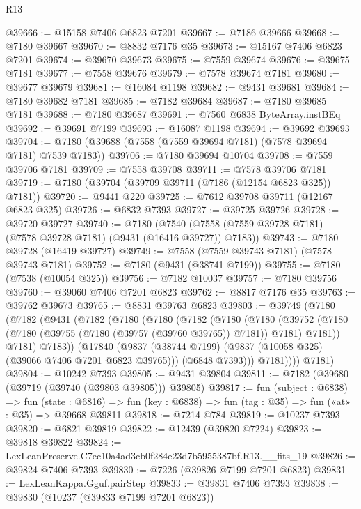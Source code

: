 \begin{lexlean}{R13}
\begin{coremodule}
@39666 := @15158 @7406 @6823 @7201
@39667 := @7186 @39666
@39668 := @7180 @39667
@39670 := @8832 @7176 @35
@39673 := @15167 @7406 @6823 @7201
@39674 := @39670 @39673
@39675 := @7559 @39674
@39676 := @39675 @7181
@39677 := @7558 @39676
@39679 := @7578 @39674 @7181
@39680 := @39677 @39679
@39681 := @16084 @1198
@39682 := @9431 @39681
@39684 := @7180 @39682 @7181
@39685 := @7182 @39684
@39687 := @7180 @39685 @7181
@39688 := @7180 @39687
@39691 := @7560 @6838 ByteArray.instBEq
@39692 := @39691 @7199
@39693 := @16087 @1198
@39694 := @39692 @39693
@39704 := @7180 (@39688 (@7558 (@7559 @39694 @7181) (@7578 @39694 @7181) @7539 @7183))
@39706 := @7180 @39694 @10704
@39708 := @7559 @39706 @7181
@39709 := @7558 @39708
@39711 := @7578 @39706 @7181
@39719 := @7180 (@39704 (@39709 @39711 (@7186 (@12154 @6823 @325)) @7181))
@39720 := @9441 @220
@39725 := @7612 @39708 @39711 (@12167 @6823 @325)
@39726 := @6832 @7393
@39727 := @39725 @39726
@39728 := @39720 @39727
@39740 := @7180
    (@7540 (@7558 (@7559 @39728 @7181) (@7578 @39728 @7181) (@9431 (@16416 @39727)) @7183))
@39743 := @7180 @39728 (@16419 @39727)
@39749 := @7558 (@7559 @39743 @7181) (@7578 @39743 @7181)
@39752 := @7180 (@9431 (@38741 @7199))
@39755 := @7180 (@7538 (@10054 @325))
@39756 := @7182 @10037
@39757 := @7180 @39756
@39760 := @39060 @7406 @7201 @6823
@39762 := @8817 @7176 @35
@39763 := @39762 @39673
@39765 := @8831 @39763 @6823
@39803 := @39749
    (@7180
      (@7182
        (@9431
          (@7182
            (@7180
              (@7180
                (@7182
                  (@7180
                    (@7180
                      (@39752
                        (@7180 (@7180 (@39755 (@7180 (@39757 (@39760 @39765)) @7181)) @7181) @7181))
                      @7181)
                    @7183))
                (@17840
                  (@9837 (@38744 @7199) (@9837 (@10058 @325) (@39066 @7406 @7201 @6823 @39765)))
                  (@6848 @7393)))
              @7181))))
      @7181)
@39804 := @10242 @7393
@39805 := @9431 @39804
@39811 := @7182 (@39680 (@39719 (@39740 (@39803 @39805))) @39805)
@39817 := fun (subject : @6838) =>
  fun (state : @6816) => fun (key : @6838) => fun (tag : @35) => fun («at» : @35) => @39668 @39811
@39818 := @7214 @784
@39819 := @10237 @7393
@39820 := @6821 @39819
@39822 := @12439 (@39820 @7224)
@39823 := @39818 @39822
@39824 := LexLeanPreserve.C7ec10a4ad3cb0f284e23d7b5955387bf.R13.__fits_19
@39826 := @39824 @7406 @7393
@39830 := @7226 (@39826 @7199 @7201 @6823)
@39831 := LexLeanKappa.Gguf.pairStep
@39833 := @39831 @7406 @7393
@39838 := @39830 (@10237 (@39833 @7199 @7201 @6823))

\end{coremodule}
\end{lexlean}

